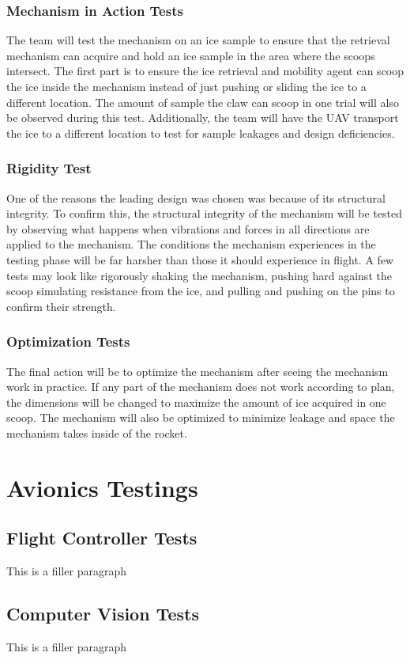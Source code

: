 		\subsubsection{Mechanism in Action Tests}
		The team will test the mechanism on an ice sample to ensure that the retrieval mechanism can acquire and hold an ice sample in the area where the scoops intersect. The first part is to ensure the ice retrieval and mobility agent can scoop the ice inside the mechanism instead of just pushing or sliding the ice to a different location. The amount of sample the claw can scoop in one trial will also be observed during this test. Additionally, the team will have the UAV transport the ice to a different location to test for sample leakages and design deficiencies.
		\subsubsection{Rigidity Test}
		One of the reasons the leading design was chosen was because of its structural integrity. To confirm this, the structural integrity of the mechanism will be tested by observing what happens when vibrations and forces in all directions are applied to the mechanism. The conditions the mechanism experiences in the testing phase will be far harsher than those it should experience in flight. A few tests may look like rigorously shaking the mechanism, pushing hard against the scoop simulating resistance from the ice, and pulling and pushing on the pins to confirm their strength. 
		\subsubsection{Optimization Tests}
		The final action will be to optimize the mechanism after seeing the mechanism work in practice. If any part of the mechanism does not work according to plan, the dimensions will be changed to maximize the amount of ice acquired in one scoop. The mechanism will also be optimized to minimize leakage and space the mechanism takes inside of the rocket.   

\section{Avionics Testings}\label{PL:Testing:Avionics}
	\subsection{Flight Controller Tests}
		This is a filler paragraph

	\subsection{Computer Vision Tests}
		This is a filler paragraph





